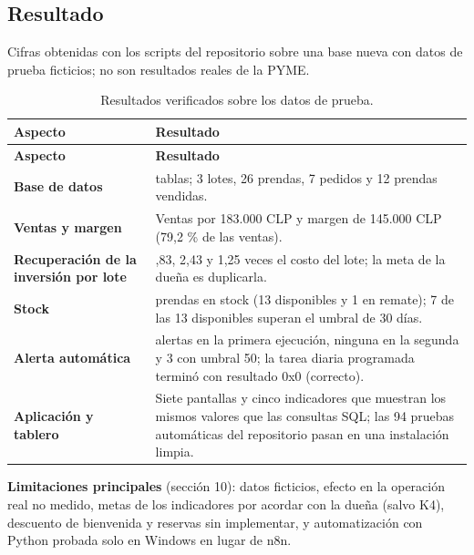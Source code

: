 \documentclass[11pt,letterpaper]{article}
\begin{document}
\subsection{Resultado}

Cifras obtenidas con los scripts del repositorio sobre una base nueva con datos de prueba ficticios; no son resultados reales de la PYME.
{\footnotesize
\setlength{\tabcolsep}{3pt}\renewcommand{\arraystretch}{1.15}
\begin{longtable}{>{\raggedright\arraybackslash}p{}>{\raggedright\arraybackslash}p{}}
\caption{Resultados verificados sobre los datos de prueba.}\\
\hline
\rowcolor[HTML]{D9EAF7}\textbf{\textbf{Aspecto}} & \textbf{\textbf{Resultado}} \\
\hline
\endfirsthead
\hline
\rowcolor[HTML]{D9EAF7}\textbf{\textbf{Aspecto}} & \textbf{\textbf{Resultado}} \\
\hline
\endhead
\textbf{Base de datos} & 10 tablas; 3 lotes, 26 prendas, 7 pedidos y 12 prendas vendidas. \\
\hline
\textbf{Ventas y margen} & Ventas por 183.000 CLP y margen de 145.000 CLP (79,2 \% de las ventas). \\
\hline
\textbf{Recuperación de la inversión por lote} & 2,83, 2,43 y 1,25 veces el costo del lote; la meta de la dueña es duplicarla. \\
\hline
\textbf{Stock} & 14 prendas en stock (13 disponibles y 1 en remate); 7 de las 13 disponibles superan el umbral de 30 días. \\
\hline
\textbf{Alerta automática} & 7 alertas en la primera ejecución, ninguna en la segunda y 3 con umbral 50; la tarea diaria programada terminó con resultado 0x0 (correcto). \\
\hline
\textbf{Aplicación y tablero} & Siete pantallas y cinco indicadores que muestran los mismos valores que las consultas SQL; las 94 pruebas automáticas del repositorio pasan en una instalación limpia. \\
\hline
\end{longtable}
}


\textbf{Limitaciones principales} (sección 10): datos ficticios, efecto en la operación real no medido, metas de los indicadores por acordar con la dueña (salvo K4), descuento de bienvenida y reservas sin implementar, y automatización con Python probada solo en Windows en lugar de n8n.
\end{document}

